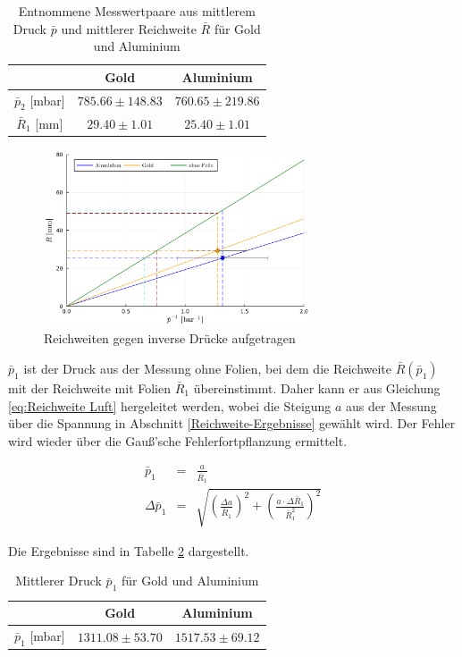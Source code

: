 \documentclass[12pt,a4paper]{scrartcl}
\numberwithin{equation}{section} %
\begin{document}
\begin{table}[H]
	\centering
	\begin{tabular}{||c||c|c||}
		\hline
		& Gold & Aluminium \\
		\hline \hline
		$\bar{p}_2$ [mbar] & $785.66 \pm 148.83$ & $760.65 \pm 219.86$ \\
		\hline
		$\bar{R}_1$ [mm] & $29.40 \pm 1.01$ & $25.40 \pm 1.01$\\
		\hline
	\end{tabular}
	\caption{Entnommene Messwertpaare aus mittlerem Druck $\bar{p}$ und mittlerer Reichweite $\bar{R}$ für Gold und Aluminium}
	\label{table_mittlereDrücke_mitFolie}
\end{table}

\begin{figure}[H]
	\centering
	\includegraphics[width=0.7\textwidth]{../media/B3.3/reichweiten inverse druecke mit Folien.pdf}
	\caption{Reichweiten gegen inverse Drücke aufgetragen}
	\label{fig:reichweiteDrückeFolie}
\end{figure}

\noindent
$\bar{p}_1$ ist der Druck aus der Messung ohne Folien, bei dem die Reichweite $\bar R(\bar p_1)$ mit der Reichweite mit Folien $\bar{R}_1$ übereinstimmt. Daher kann er aus Gleichung \eqref{eq:Reichweite Luft} hergeleitet werden, wobei die Steigung $a$ aus der Messung über die Spannung in Abschnitt \ref{Reichweite-Ergebnisse} gewählt wird. Der Fehler wird wieder über die Gauß'sche Fehlerfortpflanzung ermittelt.

\begin{eqnarray}
	\bar{p}_1 &=& \frac{a}{\bar{R}_1} \\
	\Delta \bar{p}_1 &=&
		\sqrt{\left(\frac{\Delta a}{\bar{R}_1}\right)^2 + \left(\frac{a \cdot \Delta \bar{R}_1}{\bar{R}_1^2}\right)^2}
\end{eqnarray}

\noindent
Die Ergebnisse sind in Tabelle \ref{table_p_1} dargestellt.
\begin{table}[H]
	\centering
	\begin{tabular}{||c||c|c||}
		\hline
		& Gold & Aluminium \\
		\hline \hline
		$\bar{p}_1$ [mbar] & $1311.08 \pm 53.70$ & $1517.53 \pm 69.12$ \\
		\hline
	\end{tabular}
	\caption{Mittlerer Druck $\bar{p}_1$ für Gold und Aluminium}
	\label{table_p_1}
\end{table}
\end{document}
